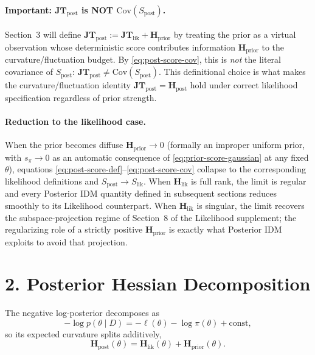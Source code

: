 \documentclass[11pt]{article}
\begin{document}
\paragraph{Important: $\mathbf{JT}_{\mathrm{post}}$ is NOT $\mathrm{Cov}(S_{\mathrm{post}})$.}
Section~3 will define $\mathbf{JT}_{\mathrm{post}} := \mathbf{JT}_{\mathrm{lik}} + \mathbf H_{\mathrm{prior}}$ by treating the prior as a virtual observation whose deterministic score contributes information $\mathbf H_{\mathrm{prior}}$ to the curvature/fluctuation budget. By \eqref{eq:post-score-cov}, this is \emph{not} the literal covariance of $S_{\mathrm{post}}$: $\mathbf{JT}_{\mathrm{post}} \neq \mathrm{Cov}(S_{\mathrm{post}})$. This definitional choice is what makes the curvature/fluctuation identity $\mathbf{JT}_{\mathrm{post}} = \mathbf H_{\mathrm{post}}$ hold under correct likelihood specification regardless of prior strength.

\paragraph{Reduction to the likelihood case.}
When the prior becomes diffuse $\mathbf H_{\mathrm{prior}} \to 0$ (formally an improper uniform prior, with $s_\pi \to 0$ as an automatic consequence of \eqref{eq:prior-score-gaussian} at any fixed $\theta$), equations \eqref{eq:post-score-def}--\eqref{eq:post-score-cov} collapse to the corresponding likelihood definitions and $S_{\mathrm{post}} \to S_{\mathrm{lik}}$. When $\mathbf H_{\mathrm{lik}}$ is full rank, the limit is regular and every Posterior IDM quantity defined in subsequent sections reduces smoothly to its Likelihood counterpart. When $\mathbf H_{\mathrm{lik}}$ is singular, the limit recovers the subspace-projection regime of Section~8 of the Likelihood supplement; the regularizing role of a strictly positive $\mathbf H_{\mathrm{prior}}$ is exactly what Posterior IDM exploits to avoid that projection.

\section*{2. Posterior Hessian Decomposition}

The negative log-posterior decomposes as
\begin{equation}
-\log p(\theta \mid D)
=
-\ell(\theta)
-\log \pi(\theta)
+ \mathrm{const},
\label{eq:neg-log-posterior}
\end{equation}
so its expected curvature splits additively,
\begin{equation}
\mathbf H_{\mathrm{post}}(\theta)
=
\mathbf H_{\mathrm{lik}}(\theta)
+ \mathbf H_{\mathrm{prior}}(\theta).
\label{eq:posterior-hessian-decomp}
\end{equation}
\end{document}
